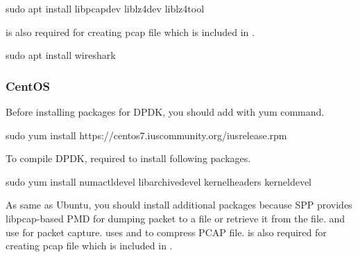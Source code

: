 \documentclass[a4paper,11pt,openany,oneside,english]{sphinxmanual}
\begin{document}
\begin{sphinxVerbatim}[commandchars=\\\{\},formatcom=\footnotesize]
 sudo apt install libpcap\PYGZhy{}dev 
  liblz4\PYGZhy{}dev 
  liblz4\PYGZhy{}tool
\end{sphinxVerbatim}

 is also required for creating pcap file which
is included in .

\begin{sphinxVerbatim}[commandchars=\\\{\},formatcom=\footnotesize]
 sudo apt install wireshark
\end{sphinxVerbatim}


\subsubsection{CentOS}
\label{\detokenize{gsg/install:centos}}
Before installing packages for DPDK, you should add
with yum command.

\begin{sphinxVerbatim}[commandchars=\\\{\},formatcom=\footnotesize]
 sudo yum install https://centos7.iuscommunity.org/ius\PYGZhy{}release.rpm
\end{sphinxVerbatim}

To compile DPDK, required to install following packages.

\begin{sphinxVerbatim}[commandchars=\\\{\},formatcom=\footnotesize]
 sudo yum install numactl\PYGZhy{}devel 
  libarchive\PYGZhy{}devel 
  kernel\PYGZhy{}headers 
  kernel\PYGZhy{}devel
\end{sphinxVerbatim}

As same as Ubuntu, you should install additional packages because
SPP provides libpcap-based PMD for dumping packet to a file or retrieve
it from the file.
 and  use  for packet capture.
 uses  and  to compress PCAP file.
 is also required for creating pcap file which is included in .
\end{document}
